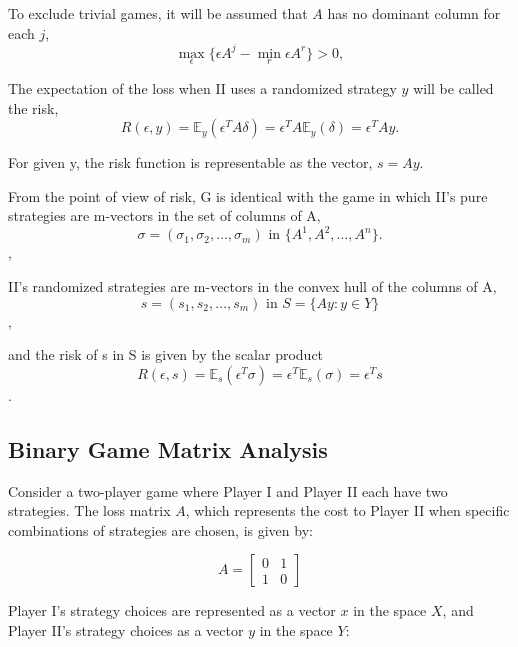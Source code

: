\documentclass[11pt]{article}
\theoremstyle{boldStyle}
\begin{document}
To exclude trivial games, it will be assumed that $A$ has no dominant column for each $j$,
\begin{equation} \label{eq:4}
    \max_{\epsilon} \{ \epsilon A^j - \min_{r} \epsilon A^r \} > 0,
\end{equation}

The expectation of the loss when II uses a randomized strategy \( y \) will be called the risk,
\[
    R(\epsilon, y) = \mathbb{E}_y(\epsilon^T A \delta) = \epsilon^T A \mathbb{E}_y(\delta) = \epsilon^T A y.
\]

For given y, the risk function is representable as the vector, $s = Ay$.

From the point of view of risk, G is identical with the game in which II's pure strategies are m-vectors in the set of columns of A, 
\begin{equation} \label{eq:6}
    \sigma = (\sigma_1, \sigma_2, \ldots, \sigma_m) \text{ in } \{A^1, A^2, \ldots, A^n\}.
\end{equation},

II's randomized strategies are m-vectors in the convex hull of the columns of A, 
\begin{equation} \label{eq:7}
    s = (s_1, s_2, \ldots, s_m) \text{ in } S = \{Ay : y \in Y \}
\end{equation},

and the risk of s in S is given by the scalar product
\begin{equation} \label{eq:8}
    R(\epsilon, s) = \mathbb{E}_s(\epsilon^T \sigma) = \epsilon^T \mathbb{E}_s(\sigma) = \epsilon^T s
\end{equation}.



\subsection{Binary Game Matrix Analysis}

Consider a two-player game where Player I and Player II each have two strategies. The loss matrix \( A \), which represents the cost to Player II when specific combinations of strategies are chosen, is given by:

\begin{equation}
    A = \begin{bmatrix}
    0 & 1 \\
    1 & 0
    \end{bmatrix}
\end{equation}

Player I's strategy choices are represented as a vector \( x \) in the space \( X \), and Player II's strategy choices as a vector \( y \) in the space \( Y \):
\end{document}
